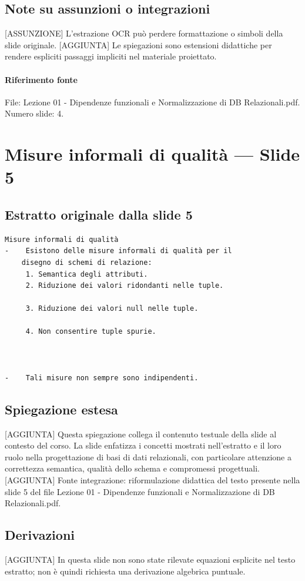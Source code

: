 \documentclass[11pt]{article}
\begin{document}
\subsection*{Note su assunzioni o integrazioni}
[ASSUNZIONE] L'estrazione OCR può perdere formattazione o simboli della slide originale.
[AGGIUNTA] Le spiegazioni sono estensioni didattiche per rendere espliciti passaggi impliciti nel materiale proiettato.
\paragraph{Riferimento fonte} File: Lezione 01 - Dipendenze funzionali e Normalizzazione di DB Relazionali.pdf. Numero slide: 4.
\section{Misure informali di qualità --- Slide 5}
\subsection*{Estratto originale dalla slide 5}
\begin{lstlisting}
Misure informali di qualità
-    Esistono delle misure informali di qualità per il
    disegno di schemi di relazione:
     1. Semantica degli attributi.
     2. Riduzione dei valori ridondanti nelle tuple.

     3. Riduzione dei valori null nelle tuple.

     4. Non consentire tuple spurie.



-    Tali misure non sempre sono indipendenti.
\end{lstlisting}
\subsection*{Spiegazione estesa}
[AGGIUNTA] Questa spiegazione collega il contenuto testuale della slide al contesto del corso. La slide enfatizza i concetti mostrati nell'estratto e il loro ruolo nella progettazione di basi di dati relazionali, con particolare attenzione a correttezza semantica, qualità dello schema e compromessi progettuali.
[AGGIUNTA] Fonte integrazione: riformulazione didattica del testo presente nella slide 5 del file Lezione 01 - Dipendenze funzionali e Normalizzazione di DB Relazionali.pdf.
\subsection*{Derivazioni}
[AGGIUNTA] In questa slide non sono state rilevate equazioni esplicite nel testo estratto; non è quindi richiesta una derivazione algebrica puntuale.
\end{document}
